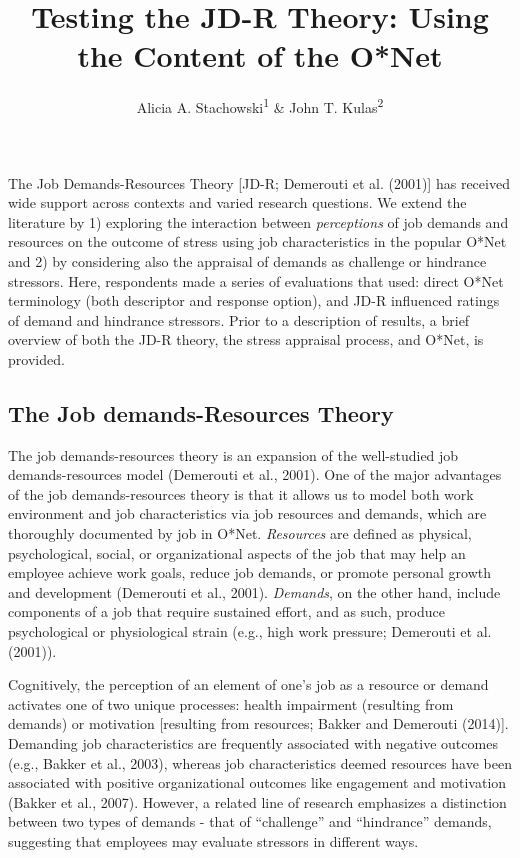 \documentclass[
  man]{apa6}
\title{Testing the JD-R Theory: Using the Content of the O*Net}
\author{Alicia A. Stachowski\textsuperscript{1} \& John T. Kulas\textsuperscript{2}}
\date{}
\affiliation{\vspace{0.5cm}\textsuperscript{1} University of Wisconsin - Stout\\\textsuperscript{2} eRg}
\begin{document}
\maketitle

The Job Demands-Resources Theory {[}JD-R; Demerouti et al. (2001){]} has received wide support across contexts and varied research questions. We extend the literature by 1) exploring the interaction between \emph{perceptions} of job demands and resources on the outcome of stress using job characteristics in the popular O*Net and 2) by considering also the appraisal of demands as challenge or hindrance stressors. Here, respondents made a series of evaluations that used: direct O*Net terminology (both descriptor and response option), and JD-R influenced ratings of demand and hindrance stressors. Prior to a description of results, a brief overview of both the JD-R theory, the stress appraisal process, and O*Net, is provided.

\hypertarget{the-job-demands-resources-theory}{%
\subsection{The Job demands-Resources Theory}\label{the-job-demands-resources-theory}}

The job demands-resources theory is an expansion of the well-studied job demands-resources model (Demerouti et al., 2001). One of the major advantages of the job demands-resources theory is that it allows us to model both work environment and job characteristics via job resources and demands, which are thoroughly documented by job in O*Net. \emph{Resources} are defined as physical, psychological, social, or organizational aspects of the job that may help an employee achieve work goals, reduce job demands, or promote personal growth and development (Demerouti et al., 2001). \emph{Demands}, on the other hand, include components of a job that require sustained effort, and as such, produce psychological or physiological strain (e.g., high work pressure; Demerouti et al. (2001)).

Cognitively, the perception of an element of one's job as a resource or demand activates one of two unique processes: health impairment (resulting from demands) or motivation {[}resulting from resources; Bakker and Demerouti (2014){]}. Demanding job characteristics are frequently associated with negative outcomes (e.g., Bakker et al., 2003), whereas job characteristics deemed resources have been associated with positive organizational outcomes like engagement and motivation (Bakker et al., 2007). However, a related line of research emphasizes a distinction between two types of demands - that of ``challenge'' and ``hindrance'' demands, suggesting that employees may evaluate stressors in different ways.
\end{document}
